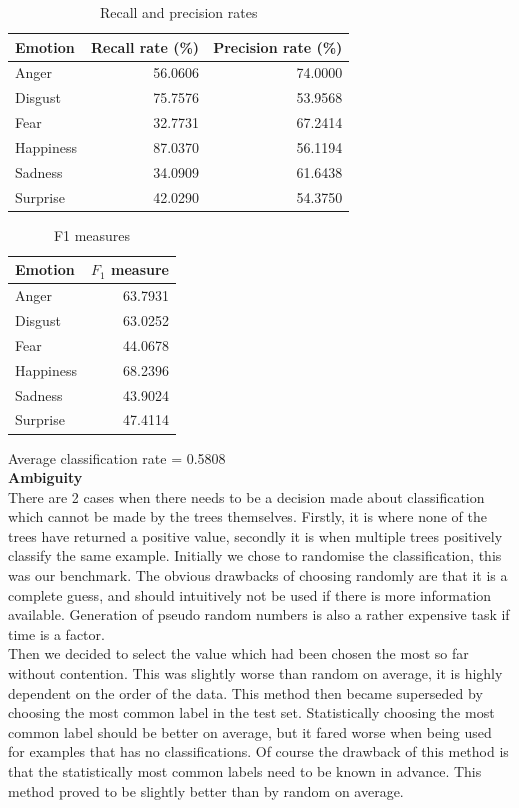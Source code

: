 \documentclass[12pt]{article}
\begin{document}
\begin{table}
\centering
\begin{tabular}{l | r r}
Emotion & Recall rate (\%) & Precision rate (\%) \\
\hline
Anger & 56.0606 & 74.0000 \\
Disgust & 75.7576 & 53.9568 \\
Fear & 32.7731 & 67.2414 \\
Happiness & 87.0370 & 56.1194 \\
Sadness & 34.0909 & 61.6438 \\
Surprise & 42.0290 & 54.3750 \\
\end{tabular}
\caption{Recall and precision rates}
\end{table}

\begin{table}
\centering
\begin{tabular}{l | r}
Emotion & \( F_1 \) measure \\
\hline
Anger & 63.7931 \\
Disgust & 63.0252 \\
Fear & 44.0678 \\
Happiness & 68.2396 \\
Sadness & 43.9024 \\
Surprise & 47.4114 \\
\end{tabular}
\caption{F1 measures}
\end{table}

Average classification rate = 0.5808 \\ 


{\bf Ambiguity} \\
There are 2 cases when there needs to be a decision made about classification which cannot be made by the trees themselves. Firstly, it is where none of the trees have returned a positive value, secondly it is when multiple trees positively classify the same example. Initially we chose to randomise the classification, this was our benchmark. The obvious drawbacks of choosing randomly are that it is a complete guess, and should intuitively not be used if there is more information available. Generation of pseudo random numbers is also a rather expensive task if time is a factor. \\

Then we decided to select the value which had been chosen the most so far without contention. This was slightly worse than random on average, it is highly dependent on the order of the data. This method then became superseded by choosing the most common label in the test set. Statistically choosing the most common label should be better on average, but it fared worse when being used for examples that has no classifications. Of course the drawback of this method is that the statistically most common labels need to be known in advance. This method proved to be slightly better than by random on average. \\
\end{document}
